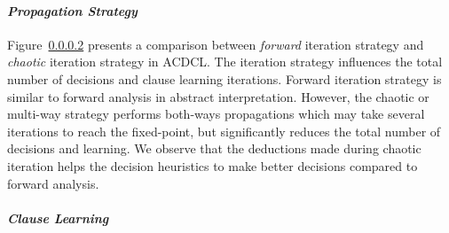 \paragraph {\em \textbf{Propagation Strategy}}      
Figure~\ref{} presents a comparison between {\em forward} iteration strategy and
{\em chaotic} iteration strategy in ACDCL.  The iteration strategy influences the total 
number of decisions and clause learning iterations.  Forward iteration strategy
is similar to forward analysis in abstract interpretation.  However, the chaotic 
or multi-way strategy performs both-ways propagations which may take several 
iterations to reach the fixed-point, but significantly reduces the total number of
decisions and learning.  We observe that the deductions made during chaotic iteration 
helps the decision heuristics to make better decisions compared to forward analysis.       
 
\paragraph {\em \textbf{Clause Learning}}      


